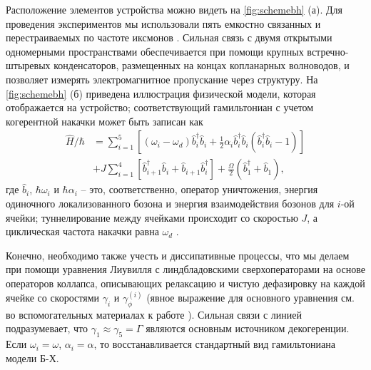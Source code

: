\documentclass[14pt, a4paper]{extreport}
\numberwithin{equation}{section}
\begin{document}
Расположение элементов устройства можно видеть на \autoref{fig:schemebh} (а). Для проведения экспериментов мы использовали пять емкостно связанных и перестраиваемых по частоте иксмонов \cite{ma2019dissipatively, li2018perfect}. Сильная связь с двумя открытыми одномерными пространствами обеспечивается при помощи крупных встречно-штыревых конденсаторов, размещенных на концах копланарных волноводов, и позволяет измерять электромагнитное пропускание через структуру. На \autoref{fig:schemebh} (б) приведена иллюстрация физической модели, которая отображается на устройство; соответствующий гамильтониан с учетом когерентной накачки может быть записан как
\begin{equation}
\begin{aligned}
\hat H/\hbar &= \sum_{i=1}^5\left[ (\omega_i - \omega_d) \hat b^\dag_i \hat b_i + \frac{1}{2} \alpha_i \hat b_i^\dag \hat b_i (\hat b^\dag_i \hat b_i - 1)\right]\\
&+J\sum_{i=1}^4 \left[\hat b^\dag_{i+1} \hat b_i + \hat b_{i+1} \hat b_i^\dag\right]+\frac{\Omega}{2}(\hat b_1^\dag + \hat b_1),
\end{aligned}\label{eq:bose-hubbard}
\end{equation} 
где $\hat b_i$, $\hbar \omega_i$ и $\hbar \alpha_i$ -- это, соответственно, оператор уничтожения, энергия одиночного локализованного бозона и энергия взаимодействия бозонов  для $i$-ой ячейки; туннелирование между ячейками происходит со скоростью $J$, а циклическая частота накачки равна $\omega_d$ \cite{egorova2020analog, fedorov2020light, yanay2020two}.

Конечно, необходимо также учесть и диссипативные процессы, что мы делаем при помощи уравнения Лиувилля с линдбладовскими сверхоператорами на основе операторов коллапса, описывающих релаксацию и чистую дефазировку на каждой ячейке со скоростями $\gamma_i$ и $\gamma_{\phi}^{(i)}$ (явное выражение для основного уравнения см. во вспомогательных материалах к работе \cite{fedorov2021photon}). Сильная связи с линией подразумевает, что $\gamma_1 \approx \gamma_5 = \Gamma$ являются основным источником декогеренции. Если $\omega_i = \omega$, $\alpha_i = \alpha$, то восстанавливается стандартный вид гамильтониана модели Б-Х.
\end{document}
